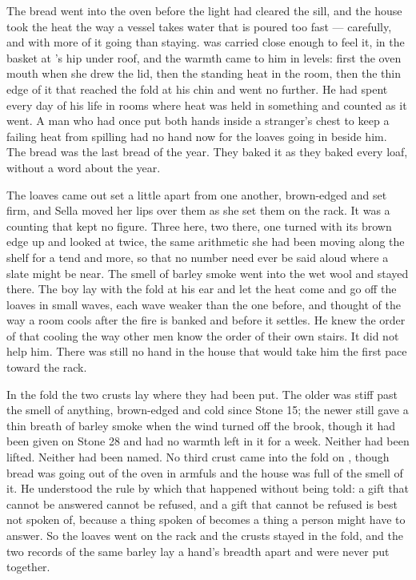 
The bread went into the oven before the light had cleared the sill, and the house took the heat the way a vessel takes water that is poured too fast --- carefully, and with more of it going than staying.  was carried close enough to feel it, in the basket at 's hip under  roof, and the warmth came to him in levels: first the oven mouth when she drew the lid, then the standing heat in the room, then the thin edge of it that reached the fold at his chin and went no further. He had spent every day of his life in rooms where heat was held in something and counted as it went. A man who had once put both hands inside a stranger's chest to keep a failing heat from spilling had no hand now for the loaves going in beside him. The bread was the last bread of the year. They baked it as they baked every loaf, without a word about the year.

The loaves came out set a little apart from one another, brown-edged and set firm, and Sella moved her lips over them as she set them on the rack. It was a counting that kept no figure. Three here, two there, one turned with its brown edge up and looked at twice, the same arithmetic she had been moving along the shelf for a tend and more, so that no number need ever be said aloud where a slate might be near. The smell of barley smoke went into the wet wool and stayed there. The boy lay with the fold at his ear and let the heat come and go off the loaves in small waves, each wave weaker than the one before, and thought of the way a room cools after the fire is banked and before it settles. He knew the order of that cooling the way other men know the order of their own stairs. It did not help him. There was still no hand in the house that would take him the first pace toward the rack.

In the fold the two crusts lay where they had been put. The older was stiff past the smell of anything, brown-edged and cold since Stone 15; the newer still gave a thin breath of barley smoke when the wind turned off the brook, though it had been given on Stone 28 and had no warmth left in it for a week. Neither had been lifted. Neither had been named. No third crust came into the fold on , though bread was going out of the oven in armfuls and the house was full of the smell of it. He understood the rule by which that happened without being told: a gift that cannot be answered cannot be refused, and a gift that cannot be refused is best not spoken of, because a thing spoken of becomes a thing a person might have to answer. So the loaves went on the rack and the crusts stayed in the fold, and the two records of the same barley lay a hand's breadth apart and were never put together.

